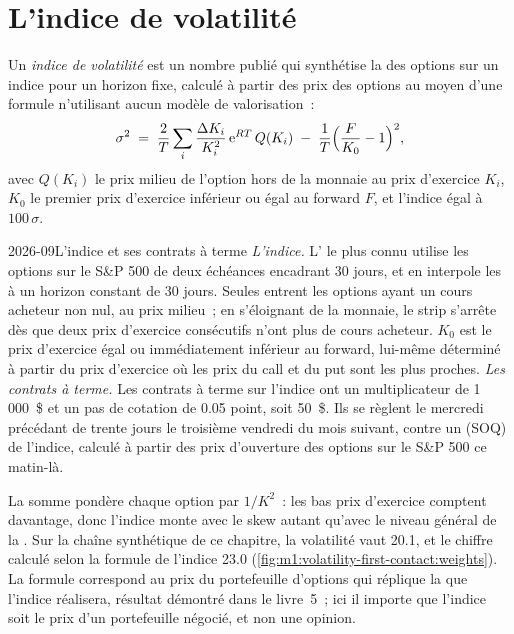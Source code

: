 \section{L'indice de volatilité}

\begin{definition}\label{def:m1:volatility-first-contact:vix}
Un \emph{indice de volatilité} est un nombre publié qui
synthétise la  des options sur un indice pour un horizon fixe,
calculé à partir des prix des options au moyen d'une formule n'utilisant aucun modèle de valorisation~:
\[
\sigma^2 \;=\; \frac{2}{T}\sum_i \frac{\Delta K_i}{K_i^2}\,\mathrm{e}^{RT}\,Q(K_i)
\;-\; \frac{1}{T}\Bigl(\frac{F}{K_0}-1\Bigr)^2 ,
\]
avec $Q(K_i)$ le prix milieu de l'option hors de la monnaie au prix d'exercice $K_i$,
$K_0$ le premier prix d'exercice inférieur ou égal au forward $F$, et l'indice égal à
$100\,\sigma$.
\end{definition}

\begin{dated}{2026-09}{L'indice et ses contrats à terme}\label{dat:m1:volatility-first-contact:vix}
\emph{L'indice.} L' le plus connu utilise les options sur le S\&P 500 de
deux échéances encadrant 30 jours, et en interpole les  à un horizon constant
de 30 jours. Seules entrent les options ayant un cours acheteur non nul, au prix milieu~; en
s'éloignant de la monnaie, le strip s'arrête dès que deux prix d'exercice consécutifs
n'ont plus de cours acheteur. $K_0$ est le prix d'exercice égal ou immédiatement inférieur au
forward, lui-même déterminé à partir du prix d'exercice où les prix du call et du put sont les plus proches. \emph{Les contrats à terme.}
Les contrats à terme sur l'indice ont un multiplicateur de 1\,000~\$ et un pas de cotation de 0.05 point,
soit 50~\$. Ils se règlent le mercredi précédant de trente jours le troisième vendredi du
mois suivant, contre un  (SOQ) de l'indice, calculé à partir des
prix d'ouverture des options sur le S\&P 500 ce matin-là.
\end{dated}

La somme pondère chaque option par $1/K^2$~: les bas prix d'exercice comptent davantage, donc
l'indice monte avec le skew autant qu'avec le niveau général de la . Sur la chaîne synthétique de ce chapitre, la volatilité 
vaut 20.1, et le chiffre calculé selon la formule de l'indice 23.0
(\cref{fig:m1:volatility-first-contact:weights}). La formule correspond au prix
du portefeuille d'options qui réplique la \emph{} que l'indice
réalisera, résultat démontré dans le livre~5~; ici il importe que l'indice soit le prix
d'un portefeuille négocié, et non une opinion.

